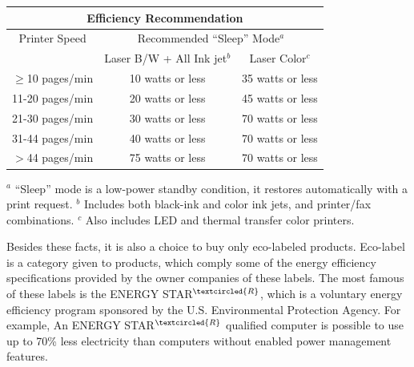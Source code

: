         \begin{table}
        \centering
            \begin{tabular}{|r|c|c|}
            \hline
            \multicolumn{ 3}{|c|}{{\bf Efficiency Recommendation}} \\
            \hline
            \multicolumn{ 1}{|c|}{Printer Speed} & \multicolumn{ 2}{|c|}{Recommended ``Sleep'' Mode$^a$} \\
            \hline
            \multicolumn{ 1}{|c|}{} & Laser B/W + All Ink jet$^b$ & Laser Color$^c$ \\
            \hline
            $\geq$10 pages/min & 10 watts or less & 35 watts or less \\
            \hline
            11-20 pages/min & 20 watts or less & 45 watts or less \\
            \hline
            21-30 pages/min & 30 watts or less & 70 watts or less \\
            \hline
            31-44 pages/min & 40 watts or less & 70 watts or less \\
            \hline
            $>$44 pages/min & 75 watts or less & 70 watts or less \\
            \hline
            \end{tabular}\linebreak            
            $^a$ ``Sleep'' mode is a low-power standby condition, it restores automatically with a print request.\linebreak            
            $^b$ Includes both black-ink and color ink jets, and printer/fax combinations.\linebreak            
            $^c$ Also includes LED and thermal transfer color printers.
             \label{tab:energy_recommendation_efficient_printer}
        \end{table}
        
        Besides these facts, it is also a choice to buy only eco-labeled products. Eco-label is a category given to products, which comply some of the energy efficiency specifications provided by the owner companies of these labels. The most famous of these labels is the ENERGY STAR$^{\textcircled {\scriptsize R}}$, which is a voluntary energy efficiency program sponsored by the U.S. Environmental Protection Agency. For example, An ENERGY STAR$^{\textcircled {\scriptsize R}}$ qualified computer is possible to use up to 70\% less electricity than computers without enabled power management features.
            
